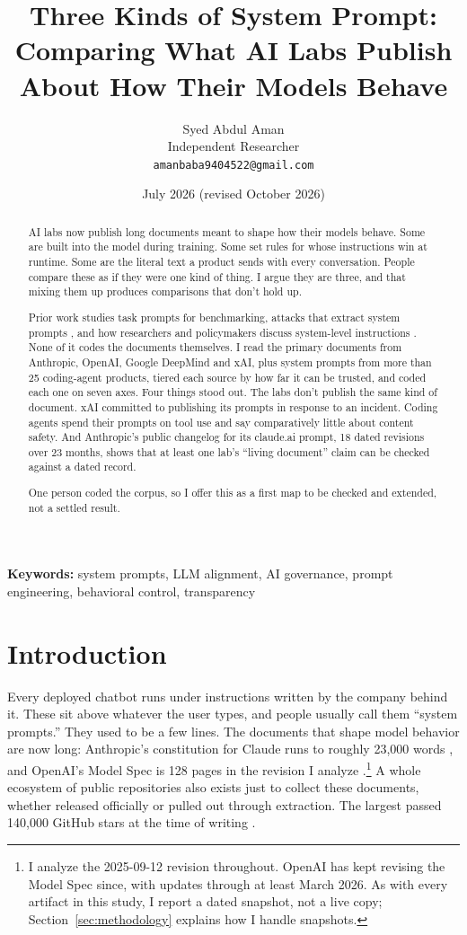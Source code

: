 \documentclass[11pt]{article}
\title{\textbf{Three Kinds of System Prompt:\\
Comparing What AI Labs Publish\\
About How Their Models Behave}}
\author{Syed Abdul Aman \\
Independent Researcher \\
\texttt{amanbaba9404522@gmail.com}}
\date{July 2026 (revised October 2026)}
\begin{document}
\maketitle

\begin{abstract}
AI labs now publish long documents meant to shape how their models behave.
Some are built into the model during training. Some set rules for whose
instructions win at runtime. Some are the literal text a product sends with
every conversation. People compare these as if they were one kind of thing.
I argue they are three, and that mixing them up produces comparisons that
don't hold up.

Prior work studies task prompts for benchmarking, attacks that extract system
prompts \citep{promptleak2026}, and how researchers and policymakers discuss
system-level instructions \citep{neumann2026governance}. None of it codes the
documents themselves. I read the primary documents from Anthropic, OpenAI,
Google DeepMind and xAI, plus system prompts from more than 25 coding-agent
products, tiered each source by how far it can be trusted, and coded each one
on seven axes. Four things stood out. The labs don't publish the same kind of
document. xAI committed to publishing its prompts in response to an incident.
Coding agents spend their prompts on tool use and say comparatively little
about content safety. And Anthropic's public changelog for its claude.ai
prompt, 18 dated revisions over 23 months, shows that at least one lab's
``living document'' claim can be checked against a dated record.

One person coded the corpus, so I offer this as a first map to be checked and
extended, not a settled result.
\end{abstract}

\noindent\textbf{Keywords:} system prompts, LLM alignment, AI governance,
prompt engineering, behavioral control, transparency

\section{Introduction}

Every deployed chatbot runs under instructions written by the company behind
it. These sit above whatever the user types, and people usually call them
``system prompts.'' They used to be a few lines. The documents that shape
model behavior are now long: Anthropic's constitution for Claude runs to
roughly 23,000 words \citep{anthropic2026constitution}, and OpenAI's Model
Spec is 128 pages in the revision I analyze
\citep{openai2025modelspec}.\footnote{I analyze the 2025-09-12 revision
throughout. OpenAI has kept revising the Model Spec since, with updates
through at least March 2026. As with every artifact in this study, I report a
dated snapshot, not a live copy; Section~\ref{sec:methodology} explains how I
handle snapshots.} A whole ecosystem of public repositories also exists just
to collect these documents, whether released officially or pulled out through
extraction. The largest passed 140,000 GitHub stars at the time of writing
\citep{x1xhlol2026repo}.
\end{document}

